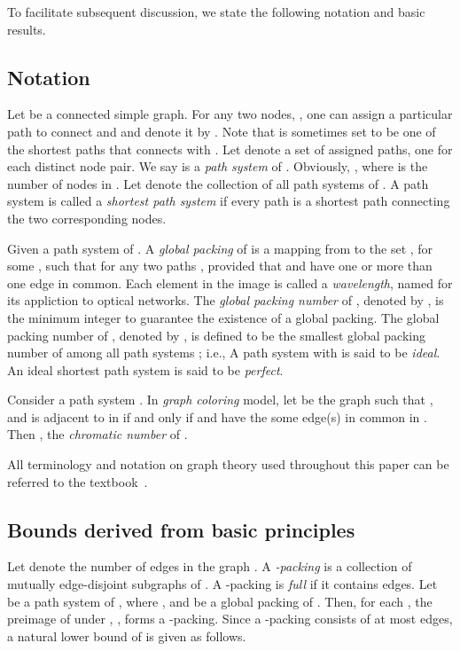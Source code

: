 \documentclass[journal,draftcls,onecolumn,12pt,twoside]{IEEEtran}
\begin{document}
To facilitate subsequent discussion, we state the following notation and basic results.

\subsection{Notation} \label{sec:intro_notation}
Let  be a connected simple graph. 
For any two nodes, , one can assign a particular path to connect  and 
and denote it by .
Note that  is sometimes set to be one of the shortest paths that connects  with .
Let  denote a set of assigned paths,
one for each distinct node pair.
We say  is a \emph{path system} of .
Obviously, , where  is the number of nodes in .
Let  denote the collection of all path systems of .
A path system is called a \emph{shortest path system} if every path is a shortest path connecting the two corresponding nodes.

Given a path system  of . 
A \emph{global packing} of  is a mapping  from  to the set , for some , such that for any two paths ,  provided that  and  have one or more than one edge in common.
Each element in the image  is called a \emph{wavelength}, named for its appliction to optical networks.
The \emph{global packing number} of , denoted by , is the minimum integer  to guarantee the existence of a global packing.
The global packing number of , denoted by , is defined to be the smallest global packing number of  among all path systems ; i.e., 
A path system  with  is said to be \emph{ideal}.
An ideal shortest path system is said to be {\em perfect}.

Consider a path system .
In \emph{graph coloring} model, let  be the graph such that , and  is adjacent to  in  if and only if  and  have the some edge(s) in common in .
Then , the \emph{chromatic number} of .

All terminology and notation on graph theory used throughout this paper can be referred
to the textbook~\cite{West_01}.





\subsection{Bounds derived from basic principles} \label{sec:intro_bound}
Let  denote the number of edges in the graph .
A \emph{-packing} is a collection of mutually edge-disjoint subgraphs of .
A -packing is \emph{full} if it contains  edges.
Let  be a path system of , where , and  be a global packing of .
Then, for each , the preimage of  under , , forms a -packing.
Since a -packing consists of at most  edges, a natural lower bound of  is given as follows.
\end{document}
